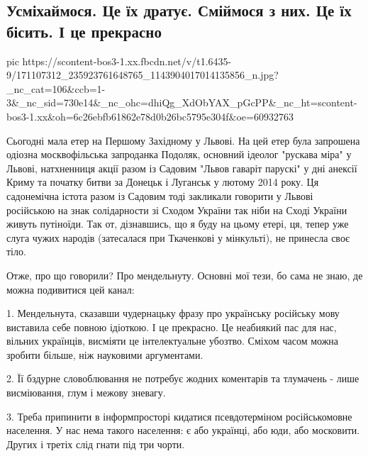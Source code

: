  
 
 
 
 

\subsection{Усміхаймося. Це їх дратує. Сміймося з них. Це їх бісить. І це прекрасно}


\ifcmt
  pic https://scontent-bos3-1.xx.fbcdn.net/v/t1.6435-9/171107312_235923761648765_1143904017014135856_n.jpg?_nc_cat=106&ccb=1-3&_nc_sid=730e14&_nc_ohc=dhiQg_XdObYAX_pGcPP&_nc_ht=scontent-bos3-1.xx&oh=6c26ebfb61862e78d0b26bc5795e304f&oe=60932763
\fi

Сьогодні мала етер на Першому Західному у Львові. На цей етер була запрошена
одіозна москвофільська запроданка Подоляк, основний ідеолог "рускава міра" у
Львові, натхненниця акції разом із Садовим "Львов гаваріт парускі" у дні
анексії Криму та початку битви за Донецьк і Луганськ у лютому 2014 року. Ця
садонемічна істота разом із Садовим тоді закликали говорити у Львові російською
на знак солідарности зі Сходом України так ніби на Сході України живуть
путіноїди. Так от, дізнавшись, що я буду на цьому етері, ця, тепер уже слуга
чужих народів (затесалася при Ткаченкові у мінкульті), не принесла  своє тіло. 

Отже, про що говорили? Про мендельнуту. Основні мої тези, бо сама не знаю, де
можна подивитися цей канал:

1. Мендельнута, сказавши чудернацьку фразу про українську російську мову
виставила себе повною ідіоткою. І це прекрасно. Це неабиякий пас для нас,
вільних українців, висміяти це інтелектуальне убозтво. Сміхом часом можна
зробити більше, ніж науковими аргументами.

2. Її бздурне словоблювання не потребує жодних коментарів та тлумачень - лише
висміювання, глум і межову зневагу.

3. Треба припинити в інформпросторі кидатися псевдотерміном російськомовне
населення. У нас нема такого населення: є або українці, або юди, або московити.
Других і третіх слід гнати під три чорти.

